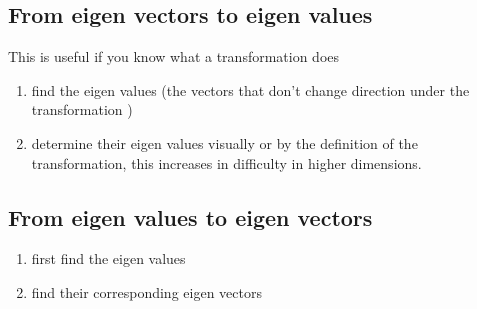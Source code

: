 \documentclass[11pt]{book}
\begin{document}
\subsection{From eigen vectors to eigen values }%
\label{sub:from_eigen_vectors_to_eigen_values_}

This is useful if you know what a transformation does

\begin{enumerate}
    \item find the eigen values (the vectors that don't change direction under the transformation )
    \item determine their eigen values visually or by the definition of the transformation, this increases in difficulty in higher dimensions. 
\end{enumerate}

\subsection{From eigen values to eigen vectors }%
\label{sub:from_eigen_values_to_eigen_vectors_}

\begin{enumerate}
    \item first find the eigen values 
    \item find their corresponding eigen vectors 
\end{enumerate}
\end{document}
